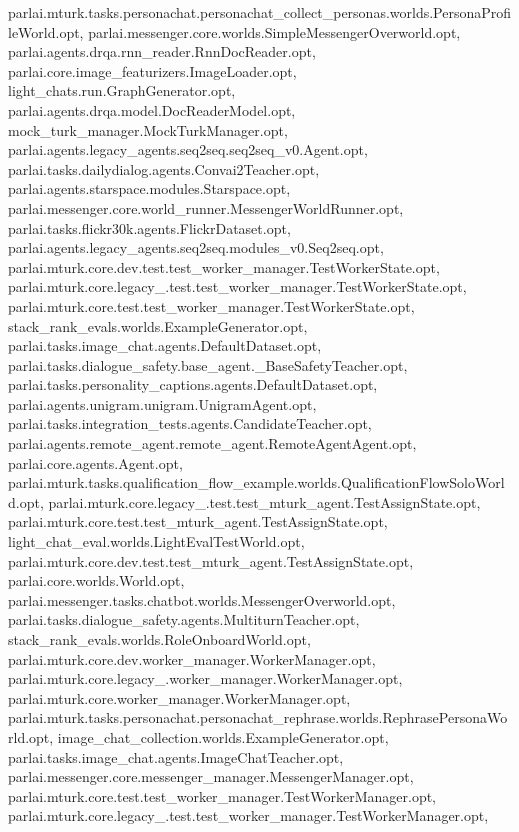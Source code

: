 parlai.\+mturk.\+tasks.\+personachat.\+personachat\+\_\+collect\+\_\+personas.\+worlds.\+Persona\+Profile\+World.\+opt, parlai.\+messenger.\+core.\+worlds.\+Simple\+Messenger\+Overworld.\+opt, parlai.\+agents.\+drqa.\+rnn\+\_\+reader.\+Rnn\+Doc\+Reader.\+opt, parlai.\+core.\+image\+\_\+featurizers.\+Image\+Loader.\+opt, light\+\_\+chats.\+run.\+Graph\+Generator.\+opt, parlai.\+agents.\+drqa.\+model.\+Doc\+Reader\+Model.\+opt, mock\+\_\+turk\+\_\+manager.\+Mock\+Turk\+Manager.\+opt, parlai.\+agents.\+legacy\+\_\+agents.\+seq2seq.\+seq2seq\+\_\+v0.\+Agent.\+opt, parlai.\+tasks.\+dailydialog.\+agents.\+Convai2\+Teacher.\+opt, parlai.\+agents.\+starspace.\+modules.\+Starspace.\+opt, parlai.\+messenger.\+core.\+world\+\_\+runner.\+Messenger\+World\+Runner.\+opt, parlai.\+tasks.\+flickr30k.\+agents.\+Flickr\+Dataset.\+opt, parlai.\+agents.\+legacy\+\_\+agents.\+seq2seq.\+modules\+\_\+v0.\+Seq2seq.\+opt, parlai.\+mturk.\+core.\+dev.\+test.\+test\+\_\+worker\+\_\+manager.\+Test\+Worker\+State.\+opt, parlai.\+mturk.\+core.\+legacy\+\_.\+test.\+test\+\_\+worker\+\_\+manager.\+Test\+Worker\+State.\+opt, parlai.\+mturk.\+core.\+test.\+test\+\_\+worker\+\_\+manager.\+Test\+Worker\+State.\+opt, stack\+\_\+rank\+\_\+evals.\+worlds.\+Example\+Generator.\+opt, parlai.\+tasks.\+image\+\_\+chat.\+agents.\+Default\+Dataset.\+opt, parlai.\+tasks.\+dialogue\+\_\+safety.\+base\+\_\+agent.\+\_\+\+Base\+Safety\+Teacher.\+opt, parlai.\+tasks.\+personality\+\_\+captions.\+agents.\+Default\+Dataset.\+opt, parlai.\+agents.\+unigram.\+unigram.\+Unigram\+Agent.\+opt, parlai.\+tasks.\+integration\+\_\+tests.\+agents.\+Candidate\+Teacher.\+opt, parlai.\+agents.\+remote\+\_\+agent.\+remote\+\_\+agent.\+Remote\+Agent\+Agent.\+opt, parlai.\+core.\+agents.\+Agent.\+opt, parlai.\+mturk.\+tasks.\+qualification\+\_\+flow\+\_\+example.\+worlds.\+Qualification\+Flow\+Solo\+World.\+opt, parlai.\+mturk.\+core.\+legacy\+\_.\+test.\+test\+\_\+mturk\+\_\+agent.\+Test\+Assign\+State.\+opt, parlai.\+mturk.\+core.\+test.\+test\+\_\+mturk\+\_\+agent.\+Test\+Assign\+State.\+opt, light\+\_\+chat\+\_\+eval.\+worlds.\+Light\+Eval\+Test\+World.\+opt, parlai.\+mturk.\+core.\+dev.\+test.\+test\+\_\+mturk\+\_\+agent.\+Test\+Assign\+State.\+opt, parlai.\+core.\+worlds.\+World.\+opt, parlai.\+messenger.\+tasks.\+chatbot.\+worlds.\+Messenger\+Overworld.\+opt, parlai.\+tasks.\+dialogue\+\_\+safety.\+agents.\+Multiturn\+Teacher.\+opt, stack\+\_\+rank\+\_\+evals.\+worlds.\+Role\+Onboard\+World.\+opt, parlai.\+mturk.\+core.\+dev.\+worker\+\_\+manager.\+Worker\+Manager.\+opt, parlai.\+mturk.\+core.\+legacy\+\_.\+worker\+\_\+manager.\+Worker\+Manager.\+opt, parlai.\+mturk.\+core.\+worker\+\_\+manager.\+Worker\+Manager.\+opt, parlai.\+mturk.\+tasks.\+personachat.\+personachat\+\_\+rephrase.\+worlds.\+Rephrase\+Persona\+World.\+opt, image\+\_\+chat\+\_\+collection.\+worlds.\+Example\+Generator.\+opt, parlai.\+tasks.\+image\+\_\+chat.\+agents.\+Image\+Chat\+Teacher.\+opt, parlai.\+messenger.\+core.\+messenger\+\_\+manager.\+Messenger\+Manager.\+opt, parlai.\+mturk.\+core.\+test.\+test\+\_\+worker\+\_\+manager.\+Test\+Worker\+Manager.\+opt, parlai.\+mturk.\+core.\+legacy\+\_.\+test.\+test\+\_\+worker\+\_\+manager.\+Test\+Worker\+Manager.\+opt, 
